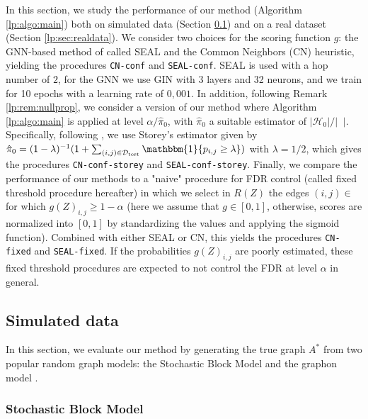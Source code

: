 \documentclass[a4paper, 11pt]{article}
\theoremstyle{remark}
\DeclareMathOperator{\ind}{\mathbbm{1}}
\DeclareMathOperator{\Dtest}{\cD_{\text{test}}}
\newcommand{\EM}{\ensuremath}
\newcommand{\cD}{\EM{\mathcal{D}}}
\newcommand{\cH}{\EM{\mathcal{H}}}
\begin{document}
In this section, we study the performance of our method (Algorithm \ref{lp:algo:main}) both on simulated data (Section \ref{lp:sec:simu}) and on a real dataset (Section \ref{lp:sec:realdata}). 
We consider two choices for the scoring function $g$: the GNN-based method of \citep{zhang2018link} called SEAL and the Common Neighbors (CN) heuristic, yielding the procedures \texttt{CN-conf} and \texttt{SEAL-conf}. SEAL is used with a hop number of $2$, for the GNN we use GIN \citep{xu2018powerful} with 3 layers and 32 neurons, and we train for 10 epochs with a learning rate of $0,001$. 
In addition, following Remark \ref{lp:rem:nullprop}, we consider a version of our method where Algorithm \ref{lp:algo:main} is applied at level $ \alpha / \hat \pi_0$, with $\hat \pi_0$ a suitable estimator of $\vert \cH_0 \vert / \vert \Dtest \vert $. Specifically, following \cite{marandon22b}, we use Storey's estimator \citep{STS2004} given by $\hat \pi_0 =(1-\lambda)^{-1}(1+ \sum_{(i,j) \in \Dtest} \ind \{p_{i,j} \geq \lambda \} )$ with $\lambda =1/2$, which gives the procedures \texttt{CN-conf-storey} and \texttt{SEAL-conf-storey}. 
Finally, we compare the performance of our methods to a "naive" procedure for FDR control (called fixed threshold procedure hereafter) in which we select in $R(Z)$ the edges $(i,j) \in \Dtest$ for which $g(Z)_{i,j} \geq 1-\alpha$ (here we assume that $g \in [0,1]$, otherwise, scores are normalized into $[0,1]$ by standardizing the values and applying the sigmoid function). Combined with either SEAL or CN, this yields the procedures \texttt{CN-fixed} and \texttt{SEAL-fixed}.  If the probabilities $g(Z)_{i,j}$ are poorly estimated, these fixed threshold procedures are expected to not control the FDR at level $\alpha$ in general. 






\subsection{Simulated data} \label{lp:sec:simu}

In this section, we evaluate our method by generating the true graph $A^*$ from two popular random graph models: the Stochastic Block Model and the graphon model \citep{matias2014modeling}. 

\subsubsection{Stochastic Block Model} \label{lp:sec:simu:sbm}
\usetikzlibrary{shapes.geometric, arrows}
\end{document}
